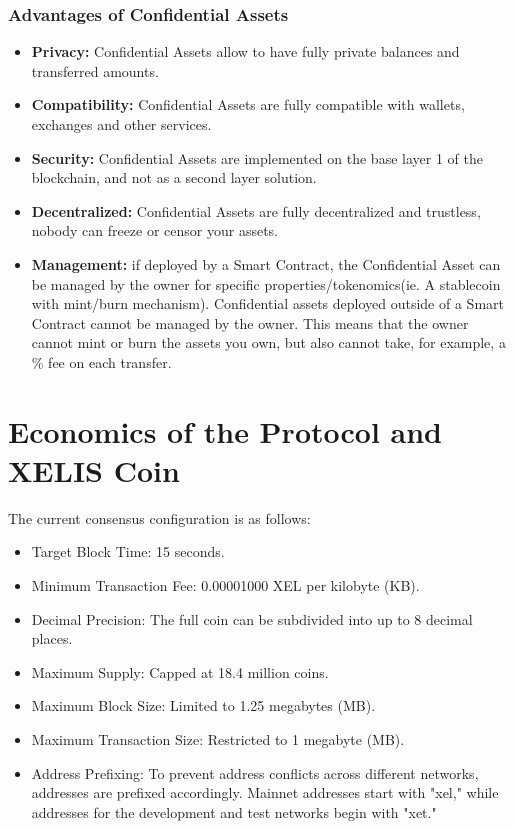 \documentclass[12pt,a4paper,twocolumn]{article}
\begin{document}
\subsubsection{Advantages of Confidential Assets}
\begin{itemize}
\item \textbf{Privacy:} Confidential Assets allow to have fully private balances and transferred amounts.\\

\item \textbf{Compatibility:} Confidential Assets are fully compatible with wallets, exchanges and other services.\\

\item \textbf{Security:} Confidential Assets are implemented on the base layer 1 of the blockchain, and not as a second layer solution.\\

\item \textbf{Decentralized:} Confidential Assets are fully decentralized and trustless, nobody can freeze or censor your assets.\\

\item \textbf{Management:} if deployed by a Smart Contract, the Confidential Asset can be managed by the owner for specific properties/tokenomics(ie. A stablecoin with mint/burn mechanism). Confidential assets deployed outside of a Smart Contract cannot be managed by the owner. This means that the owner cannot mint or burn the assets you own, but also cannot take, for example, a \% fee on each transfer.\\
\end{itemize}

\section{Economics of the Protocol and XELIS Coin}

The current consensus configuration is as follows:

\begin{itemize}
    \item Target Block Time: 15 seconds.
    \item Minimum Transaction Fee: 0.00001000 XEL per kilobyte (KB).
    \item Decimal Precision: The full coin can be subdivided into up to 8 decimal places.
    \item Maximum Supply: Capped at 18.4 million coins.
    \item Maximum Block Size: Limited to 1.25 megabytes (MB).
    \item Maximum Transaction Size: Restricted to 1 megabyte (MB).
    \item Address Prefixing: To prevent address conflicts across different networks, addresses are prefixed accordingly. Mainnet addresses start with "xel," while addresses for the development and test networks begin with "xet."
\end{itemize}
\end{document}
